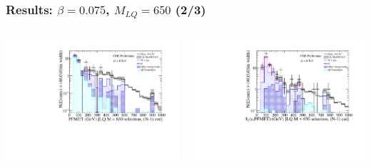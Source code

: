 \documentclass[bigger]{beamer}
\begin{document}
\begin{frame}
\frametitle{Results: $\beta = 0.075$, $M_{LQ} = 650$ (2/3)}
\label{sec-7-2-2}
\begin{columns}
\begin{column}{0.6\textwidth}
\label{sec-7-2-2-1}

\centering
\met
\includegraphics[width=\textwidth]{fig/enu/nMinus1/MET_stAndMtAndMejLQ650_enujj.pdf}
\end{column}
\begin{column}{0.6\textwidth}
\label{sec-7-2-2-2}

\centering
\mt
\includegraphics[width=\textwidth]{fig/enu/nMinus1/MTenu_stAndMetAndMejLQ650_enujj.pdf}
\end{column}
\end{columns}
\end{frame}
\end{document}
